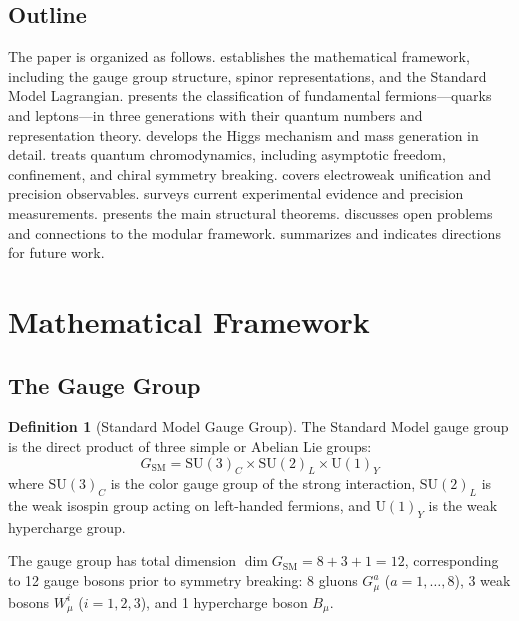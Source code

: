 \documentclass[12pt]{article}
\theoremstyle{definition}
\newtheorem{definition}[theorem]{Definition}
\theoremstyle{remark}
\begin{document}
\subsection{Outline}

The paper is organized as follows.  establishes the mathematical framework, including the gauge group structure, spinor representations, and the Standard Model Lagrangian.  presents the classification of fundamental fermions---quarks and leptons---in three generations with their quantum numbers and representation theory.  develops the Higgs mechanism and mass generation in detail.  treats quantum chromodynamics, including asymptotic freedom, confinement, and chiral symmetry breaking.  covers electroweak unification and precision observables.  surveys current experimental evidence and precision measurements.  presents the main structural theorems.  discusses open problems and connections to the modular framework.  summarizes and indicates directions for future work.

\section{Mathematical Framework}
\label{sec:mathframework}

\subsection{The Gauge Group}

\begin{definition}[Standard Model Gauge Group]
\label{def:gaugegroup}
The Standard Model gauge group is the direct product of three simple or Abelian Lie groups:
\begin{equation}
\label{eq:gaugegroup}
G_{\mathrm{SM}} = \mathrm{SU}(3)_C \times \mathrm{SU}(2)_L \times \mathrm{U}(1)_Y
\end{equation}
where $\mathrm{SU}(3)_C$ is the color gauge group of the strong interaction, $\mathrm{SU}(2)_L$ is the weak isospin group acting on left-handed fermions, and $\mathrm{U}(1)_Y$ is the weak hypercharge group.
\end{definition}

The gauge group has total dimension $\dim G_{\mathrm{SM}} = 8 + 3 + 1 = 12$, corresponding to 12 gauge bosons prior to symmetry breaking: 8 gluons $G^a_\mu$ ($a = 1, \ldots, 8$), 3 weak bosons $W^i_\mu$ ($i = 1, 2, 3$), and 1 hypercharge boson $B_\mu$.
\end{document}
